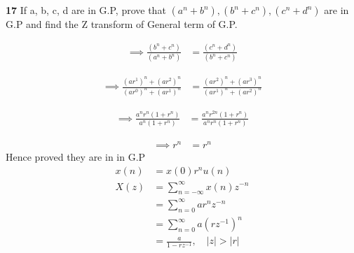 \documentclass[journal,12pt,twocolumn]{IEEEtran}
\theoremstyle{remark}
\begin{document}


\vspace{3cm}

\title{}
\author{EE23BTECH11047 - Deepakreddy P
}
\maketitle
\newpage
\bigskip

\noindent \textbf{17} \quad 
If a, b, c, d are in G.P, prove that 
$ (a^{n} + b^{n}),(b^{n} + c^{n}),(c^{n} + d^{n}) $ are in G.P and find the Z transform of General term of G.P.\\
\solution

\begin{center}
    \begin{table}[ht]
        
    \end{table}
\end{center}

\begin{align} \implies \frac{(b^n + c^n)}{(a^n + b^n)} &= \frac{(c^n + d^n)}{(b^n + c^n)} \end{align}

\begin{align} \implies \frac{(ar^1)^n + (ar^2)^n}{(ar^0)^n + (ar^1)^n}  &= \frac{(ar^2)^n + (ar^3)^n}{(ar^1)^n + (ar^2)^n} \end{align}

\begin{align} \implies \frac{a^n r^n(1 + r^n)}{a^n(1 + r^n)} &= \frac{a^n r^{2n}(1 + r^n)}{a^n r^n (1 + r^n)} \end{align}

\begin{align} \implies r^n &= r^n \end{align}
Hence proved they are in in G.P
\begin{align}
    x(n) &= x(0)r^{n} u(n)\\
    X(z) &= \sum_{n=-\infty}^{\infty} {x(n) z^{-n}}\\
    &= \sum_{n=0}^{\infty} {ar^{n} z^{-n}}\\
    &= \sum_{n=0}^{\infty} {a (rz^{-1})^{n}}\\
    &= \frac{a}{1-rz^{-1}}, \quad |z|>|r|
\end{align}
\end{document}
